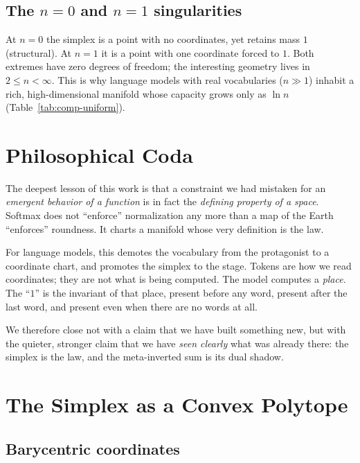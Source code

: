 \documentclass[11pt]{article}
\begin{document}
\subsection{The $n=0$ and $n=1$ singularities}
\label{sec:edge-sing}

At $n=0$ the simplex is a point with no coordinates, yet retains mass $1$
(structural). At $n=1$ it is a point with one coordinate forced to $1$. Both
extremes have zero degrees of freedom; the interesting geometry lives in
$2\le n < \infty$. This is why language models with real vocabularies
($n\gg 1$) inhabit a rich, high-dimensional manifold whose capacity grows only
as $\ln n$ (Table~\ref{tab:comp-uniform}).

\section{Philosophical Coda}
\label{sec:coda}

The deepest lesson of this work is that a constraint we had mistaken for an
\emph{emergent behavior of a function} is in fact the \emph{defining property of
a space}. Softmax does not ``enforce'' normalization any more than a map of the
Earth ``enforces'' roundness. It charts a manifold whose very definition is the
law.

For language models, this demotes the vocabulary from the protagonist to a
coordinate chart, and promotes the simplex to the stage. Tokens are how we read
coordinates; they are not what is being computed. The model computes a
\emph{place}. The ``$1$'' is the invariant of that place, present before any
word, present after the last word, and present even when there are no words at
all.

We therefore close not with a claim that we have built something new, but with
the quieter, stronger claim that we have \emph{seen clearly} what was already
there: the simplex is the law, and the meta-inverted sum is its dual shadow.

\section{The Simplex as a Convex Polytope}
\label{sec:polytope}

\subsection{Barycentric coordinates}
\label{sec:poly-bary}
\end{document}
